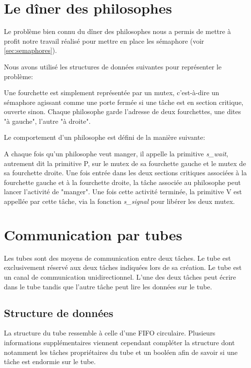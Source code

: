 
\section{Le dîner des philosophes}
Le problème bien connu du dîner des philosophes nous a permis de mettre à profit notre travail réalisé pour mettre en place les sémaphore (voir \ref{sec:semaphores}).

Nous avons utilisé les structures de données suivantes pour représenter le problème:

Une fourchette est simplement représentée par un mutex, c'est-à-dire un sémaphore agissant comme une porte fermée si une tâche est en section critique, ouverte sinon. Chaque philosophe garde l'adresse de deux fourchettes, une dites "à gauche", l'autre "à droite".

Le comportement d'un philosophe est défini de la manière suivante:

A chaque fois qu'un philosophe veut manger, il appelle la primitive \textit{s\_wait}, autrement dit la primitive P, sur le mutex de sa fourchette gauche et le mutex de sa fourchette droite. Une fois entrée dans les deux sections critiques associées à la fourchette gauche et à la fourchette droite, la tâche associée au philosophe peut lancer l'activité de "manger". Une fois cette activité terminée, la primitive V est appellée par cette tâche, via la fonction \textit{s\_signal} pour libérer les deux mutex.

\section{Communication par tubes}
Les tubes sont des moyens de communication entre deux tâches. Le tube est exclusivement réservé aux deux tâches indiquées lors de sa création.
Le tube est un canal de communication unidirectionnel. L'une des deux tâches peut écrire dans le tube tandis que l'autre tâche peut lire les données sur le tube.

\subsection{Structure de données}
La structure du tube ressemble à celle d'une FIFO circulaire. Plusieurs informations supplémentaires viennent cependant compléter la structure dont notamment les tâches propriétaires du tube et un booléen afin de savoir si une tâche est endormie sur le tube.


